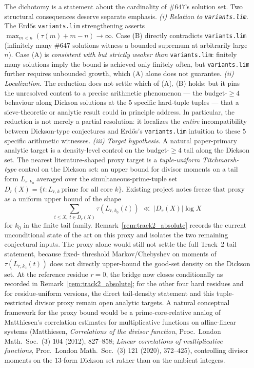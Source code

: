 \documentclass[11pt]{article}
\renewcommand{\_}{\origunderscore\allowbreak}
\theoremstyle{definition}
\theoremstyle{remark}
\begin{document}
The dichotomy is a statement about the cardinality of $\#647$'s
solution set. Two structural consequences deserve separate
emphasis.
\emph{(i) Relation to \texttt{variants.lim}.} The Erd\H{o}s
\texttt{variants.lim} strengthening asserts
$\max_{m<n}(\tau(m)+m-n)\to\infty$. Case (B) directly contradicts
\texttt{variants.lim} (infinitely many $\#647$ solutions witness
a bounded supremum at arbitrarily large $n$). Case (A) is
\emph{consistent with but strictly weaker than}
\texttt{variants.lim}: finitely many solutions imply the bound is
achieved only finitely often, but \texttt{variants.lim} further
requires unbounded growth, which (A) alone does not guarantee.
\emph{(ii) Localization.} The reduction does not settle which of
(A), (B) holds; but it pins the unresolved content to a precise
arithmetic phenomenon — the budget-$\ge 4$ behaviour along Dickson
solutions at the $5$ specific hard-tuple tuples — that a
sieve-theoretic or analytic result could in principle address. In
particular, the reduction is not merely a partial resolution: it
localizes the \emph{entire} incompatibility between Dickson-type
conjectures and Erd\H{o}s's \texttt{variants.lim} intuition to
these $5$ specific arithmetic witnesses.
\emph{(iii) Target hypothesis.} A natural paper-primary analytic
target is a density-level control on the budget-$\ge 4$ tail along the
Dickson set. The nearest literature-shaped proxy target is a
\emph{tuple-uniform Titchmarsh-type} control on the Dickson set: an
upper bound for divisor moments on a tail form $L_{r,k_0}$ averaged
over the simultaneous-prime-tuple set
$D_r(X)=\{t: L_{r,k}\,\text{prime for all core }k\}$. Existing project
notes freeze that proxy as a uniform upper bound of the shape
\[
  \sum_{t\le X,\ t\in D_r(X)} \tau(L_{r,k_0}(t))
  \;\ll\; |D_r(X)|\log X
\]
for $k_0$ in the finite tail family. Remark~\ref{rem:track2_absolute}
records the current unconditional state of the art on this proxy and
isolates the two remaining conjectural inputs. The proxy alone would
still not settle the full Track~2 tail statement, because fixed-
threshold Markov/Chebyshev on moments of $\tau(L_{r,k_0}(t))$ does
not directly upper-bound the good-set density on the Dickson set.
At the reference residue $r=0$, the bridge now closes conditionally as recorded
in Remark~\ref{rem:track2_absolute}; for the other four hard residues and for
residue-uniform versions, the direct tail-density statement and this tuple-restricted divisor proxy remain open analytic targets. A natural conceptual framework for the proxy bound would be a prime-core-relative analog of Matthiesen's correlation
estimates for multiplicative functions on affine-linear systems
(Matthiesen, \emph{Correlations of the divisor function},
Proc.\ London Math.\ Soc.\ (3) 104 (2012), 827--858;
\emph{Linear correlations of multiplicative functions},
Proc.\ London Math.\ Soc.\ (3) 121 (2020), 372--425), controlling
divisor moments on the $13$-form Dickson set rather than on the
ambient integers.
\end{document}
